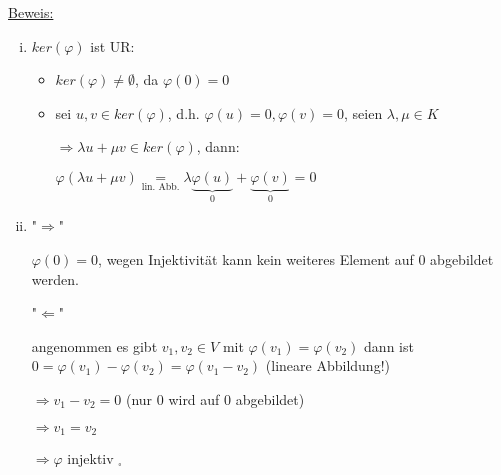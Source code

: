 \underline{Beweis:}

\begin{enumerate}[(i)]
	\item
	$ker(\varphi)$ ist UR:
	
	\begin{itemize}
		\item
		$ker(\varphi) \neq \emptyset$, da $\varphi(0) = 0$
		
		\item
		sei $u,v \in ker(\varphi)$, d.h. $\varphi(u) = 0, \varphi(v) = 0$, seien $\lambda, \mu \in K$
		
		$\Rightarrow \lambda u + \mu v \in ker(\varphi)$, dann:
		
		$\varphi(\lambda u + \mu v) \underset{\text{lin. Abb.}}{=} \lambda \underbrace{\varphi(u)}_{0} +
		\underbrace{\varphi(v)}_{0} = 0$
	\end{itemize}
	
	\item
	"$\Rightarrow$"
	
	$\varphi(0) = 0$, wegen Injektivität kann kein weiteres Element auf $0$ abgebildet werden.
	
	"$\Leftarrow$"
	
	angenommen es gibt $v_1,v_2 \in V$ mit $\varphi(v_1) = \varphi(v_2)$ dann ist $0 = \varphi(v_1) - \varphi(v_2) =
	\varphi(v_1 - v_2)$ (lineare Abbildung!)
	
	$\Rightarrow v_1 - v_2 = 0$ (nur 0 wird auf 0 abgebildet)
	
	$\Rightarrow v_1 = v_2$
	
	$\Rightarrow \varphi$ injektiv $ _\square$
\end{enumerate}

\subsection{}